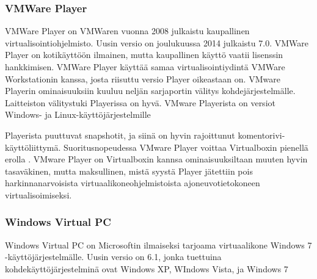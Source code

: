 \subsubsection{VMWare Player}
VMWare Player on VMWaren vuonna 2008 julkaistu kaupallinen virtualisointiohjelmisto. Uusin versio on joulukuussa 2014 julkaistu 7.0. VMWare Player on kotikäyttöön ilmainen, mutta kaupallinen käyttö vaatii lisenssin hankkimisen. VMWare Player käyttää samaa virtualisointiydintä VMWare Workstationin kanssa, josta riisuttu versio Player oikeastaan on. VMware Playerin ominaisuuksiin kuuluu neljän sarjaportin välitys kohdejärjestelmälle. Laitteiston välitystuki Playerissa on hyvä. VMware Playerista on versiot Windows- ja Linux-käyttöjärjestelmille \citep{vmware1}


Playerista puuttuvat snapshotit, ja siinä on hyvin rajoittunut komentorivi-käyttöliittymä. Suoritusnopeudessa VMware Player voittaa Virtualboxin pienellä erolla \cite{vplayervsvbox}. VMware Player on Virtualboxin kannsa ominaisuuksiltaan muuten hyvin tasaväkinen, mutta maksullinen, mistä syystä Player jätettiin pois harkinnanarvoisista virtuaalikoneohjelmistoista ajoneuvotietokoneen virtualisoimiseksi.






\subsubsection{Windows Virtual PC}
Windows Virtual PC on Microsoftin ilmaiseksi tarjoama virtuaalikone Windows 7 -käyttöjärjestelmälle. Uusin versio on 6.1, jonka tuettuina kohdekäyttöjärjestelminä ovat Windows XP, WIndows Vista, ja Windows 7 \citep{vpc_tips}

